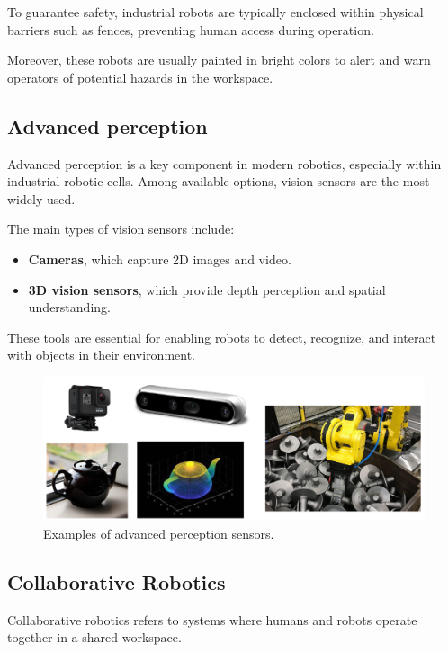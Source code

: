 To guarantee safety, industrial robots are typically enclosed within physical barriers such as fences, preventing human access during operation.

Moreover, these robots are usually painted in bright colors to alert and warn operators of potential hazards in the workspace.

\hfill

\subsection{Advanced perception}

Advanced perception is a key component in modern robotics, especially within industrial robotic cells. Among available options, vision sensors are the most widely used.

The main types of vision sensors include:
\begin{itemize}
  \item \textbf{Cameras}, which capture 2D images and video.
  \item \textbf{3D vision sensors}, which provide depth perception and spatial understanding.
\end{itemize}

These tools are essential for enabling robots to detect, recognize, and interact with objects in their environment.

\begin{figure}[H]
    \centering
    \includegraphics[width=\linewidth]{imgs/advanced_perception_sensors.png}
    \caption{Examples of advanced perception sensors.}
\end{figure}

\hfill

\subsection{Collaborative Robotics}

Collaborative robotics refers to systems where humans and robots operate together in a shared workspace.

